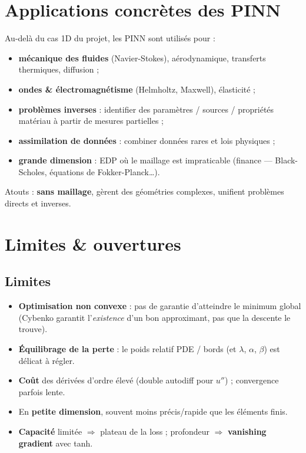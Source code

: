 \documentclass[11pt]{article}
\newcommand{\key}[1]{\textbf{#1}}
\begin{document}
\section{Applications concrètes des PINN}
Au-delà du cas 1D du projet, les PINN sont utilisés pour :
\begin{itemize}
  \item \key{mécanique des fluides} (Navier-Stokes), aérodynamique, transferts
        thermiques, diffusion ;
  \item \key{ondes \& électromagnétisme} (Helmholtz, Maxwell), élasticité ;
  \item \key{problèmes inverses} : identifier des paramètres / sources / propriétés
        matériau à partir de mesures partielles ;
  \item \key{assimilation de données} : combiner données rares et lois physiques ;
  \item \key{grande dimension} : EDP où le maillage est impraticable
        (finance — Black-Scholes, équations de Fokker-Planck\ldots).
\end{itemize}
Atouts : \key{sans maillage}, gèrent des géométries complexes, unifient
problèmes directs et inverses.

\section{Limites \& ouvertures}
\subsection*{Limites}
\begin{itemize}
  \item \key{Optimisation non convexe} : pas de garantie d'atteindre le minimum
        global (Cybenko garantit l'\emph{existence} d'un bon approximant, pas que la
        descente le trouve).
  \item \key{Équilibrage de la perte} : le poids relatif PDE / bords (et $\lambda$,
        $\alpha$, $\beta$) est délicat à régler.
  \item \key{Coût} des dérivées d'ordre élevé (double autodiff pour $u''$) ;
        convergence parfois lente.
  \item En \key{petite dimension}, souvent moins précis/rapide que les éléments finis.
  \item \key{Capacité} limitée $\Rightarrow$ plateau de la loss ; profondeur
        $\Rightarrow$ \key{vanishing gradient} avec tanh.
\end{itemize}
\end{document}

